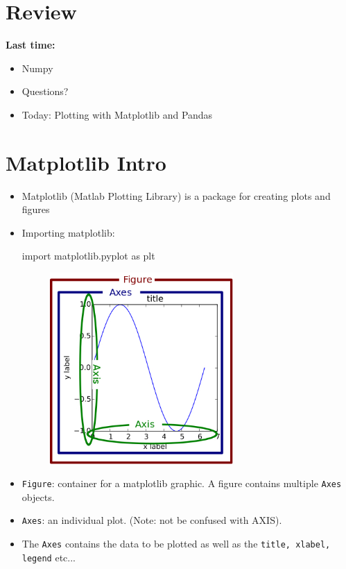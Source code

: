 \documentclass[12pt]{article}
\numberwithin{equation}{section}
\begin{document}
\section{Review}

\textbf{Last time:}
\begin{itemize}
    \item Numpy
    \item Questions?
    \item Today: Plotting with Matplotlib and Pandas 
\end{itemize}

\section{Matplotlib Intro}
\begin{itemize}

    \item Matplotlib (Matlab Plotting Library) is a package for creating plots and figures
    \item Importing matplotlib:
    \begin{python}
    import matplotlib.pyplot as plt
    \end{python}
    \begin{figure}[H]
	    \centering
	    \includegraphics[width=7cm] {fig}
    \end{figure}
    \item \verb|Figure|: container for a matplotlib graphic. A figure contains multiple \verb|Axes| objects.
    \item \verb|Axes|: an individual plot. (Note: not be confused with AXIS).
    \item The \verb|Axes| contains the data to be plotted as well as the \verb|title, xlabel, legend| etc...
\end{itemize}
\end{document}
